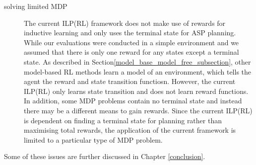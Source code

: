 \begin{description}
\item[solving limited MDP]
The current ILP(RL) framework does not make use of rewards for inductive learning and only uses the terminal state for ASP planning. While our evaluations were conducted in a simple environment and we assumed that there is only one reward for any states except a terminal state. As described in Section\ref{model_base_model_free_subsection}, other model-based RL methods learn a model of an environment, which tells the agent the reward and state transition functiosn. However, the current ILP(RL) only learns state transition and does not learn reward functions. In addition, some MDP problems contain no terminal state and instead there may be a different means to gain rewards. 
Since the current ILP(RL) is dependent on finding a terminal state for planning rather than maximising total rewards, 
the application of the current framework is limited to a particular type of MDP problem.

\end{description}  

Some of these issues are further discussed in Chapter \ref{conclusion}.

